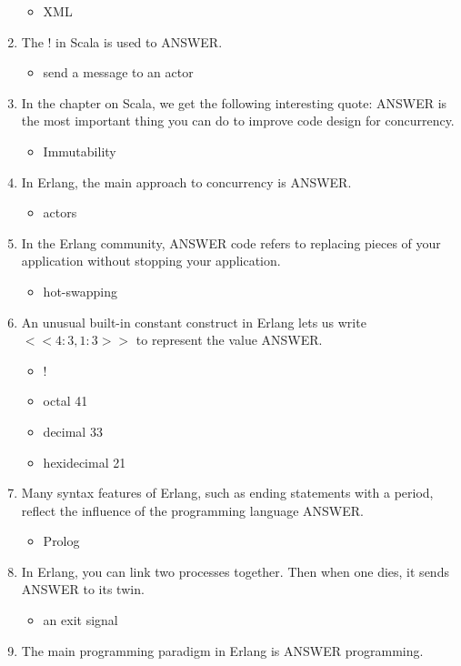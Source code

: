 \documentclass{exam}
\begin{document}
\begin{enumerate}
\begin{itemize}
\item XML
\end{itemize}
\item The ! in Scala is used to ANSWER.
\begin{itemize}
\item send a message to an actor
\end{itemize}
\item In the chapter on Scala, we get the following interesting quote: ANSWER is the most important thing you can do to improve code design for concurrency.
\begin{itemize}
\item Immutability
\end{itemize}
\item In Erlang, the main approach to concurrency is ANSWER.
\begin{itemize}
\item actors
\end{itemize}
\item In the Erlang community, ANSWER code refers to replacing pieces of your application without stopping your application.
\begin{itemize}
\item hot-swapping
\end{itemize}
\item An unusual built-in constant construct in Erlang lets us write $<<4:3,1:3>>$ to represent the value ANSWER.
\begin{itemize}
\item !
\item octal 41
\item decimal 33
\item hexidecimal 21
\end{itemize}
\item Many syntax features of Erlang, such as ending statements with a period, reflect the influence of the programming language ANSWER.
\begin{itemize}
\item Prolog
\end{itemize}
\item In Erlang, you can link two processes together.  Then when one dies, it sends ANSWER to its twin.
\begin{itemize}
\item an exit signal
\end{itemize}
\item The main programming paradigm in Erlang is ANSWER programming.

\end{enumerate}
\end{document}
